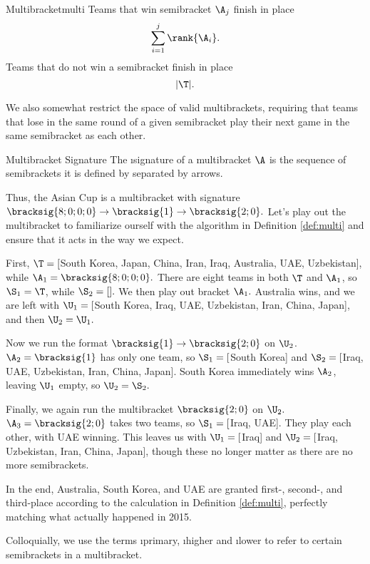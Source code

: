 {\begin{definition}{Multibracket}{multi}
        Teams that win semibracket $\A_j$ finish in place $$\sum_{i=1}^{j} \rank{\A_i}.$$
        Teams that do not win a semibracket finish in place $$|\T|.$$

        We also somewhat restrict the space of valid multibrackets, requiring that teams that lose in the same round of a given semibracket play their next game in the same semibracket as each other.
    \end{definition}

    \begin{definition}{Multibracket Signature}{}
        The \i{signature} of a multibracket $\A$ is the sequence of semibrackets it is defined by separated by arrows.
    \end{definition}

    Thus, the Asian Cup is a multibracket with signature $\bracksig{8;0;0;0} \to \bracksig{1} \to \bracksig{2;0}.$ Let's play out the multibracket to familiarize ourself with the algorithm in Definition \ref{def:multi} and ensure that it acts in the way we expect.

    First, $\T = [$South Korea, Japan, China, Iran, Iraq, Australia, UAE, Uzbekistan], while $\A_1 = \bracksig{8;0;0;0}.$ There are eight teams in both $\T$ and $\A_1$, so $\S_1 = \T$, while $\S_2 = [].$ We then play out bracket $\A_1.$ Australia wins, and we are left with $\U_1 = [$South Korea, Iraq, UAE, Uzbekistan, Iran, China, Japan], and then $\U_2 = \U_1.$

    Now we run the format $\bracksig{1} \to \bracksig{2;0}$ on $\U_2$. $\A_2 = \bracksig{1}$ has only one team, so $\S_1 =[$South Korea] and $\S_2 =[$Iraq, UAE, Uzbekistan, Iran, China, Japan]. South Korea immediately wins $\A_2$, leaving $\U_1$ empty, so $\U_2 = \S_2.$

    Finally, we again run the multibracket $\bracksig{2;0}$ on $\U_2.$ $\A_3 = \bracksig{2;0}$ takes two teams, so $\S_1 =[$Iraq, UAE]. They play each other, with UAE winning. This leaves us with $\U_1 = [$Iraq] and $\U_2 = [$Iraq, Uzbekistan, Iran, China, Japan], though these no longer matter as there are no more semibrackets.

    In the end, Australia, South Korea, and UAE are granted first-, second-, and third-place according to the calculation in Definition \ref{def:multi}, perfectly matching what actually happened in 2015.

    Colloquially, we use the terms \i{primary}, \i{higher} and \i{lower} to refer to certain semibrackets in a multibracket.

}
